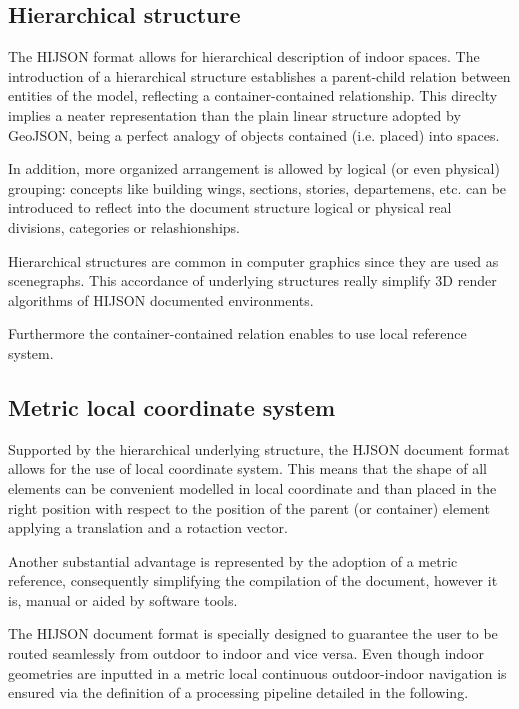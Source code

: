 \documentclass{sig-alternate}
\begin{document}
\subsection{Hierarchical structure}\label{hierarchical-structure}

The HIJSON format allows for hierarchical description of indoor spaces.  The
introduction of a hierarchical structure establishes a parent-child relation
between entities of the model, reflecting a container-contained relationship.
This direclty implies a neater representation than the plain linear structure
adopted  by GeoJSON, being a perfect analogy of objects contained (i.e.
placed) into spaces.

In addition, more organized arrangement is allowed by logical (or even
physical)  grouping: concepts like building wings, sections, stories,
departemens, etc. can be  introduced to reflect into the document structure
logical or physical real divisions,  categories or relashionships.

Hierarchical structures are common in computer graphics since they are used as
scenegraphs. This accordance of underlying structures really simplify 3D
render algorithms of HIJSON documented environments.

Furthermore the container-contained relation enables to use local reference system.

\subsection{Metric local coordinate system}\label{metric-local-coordinate-system}

Supported by the hierarchical underlying structure, the HJSON document format allows 
for the use of local coordinate system. This means that the shape of all elements can 
be convenient modelled in local coordinate and than placed in the right position 
with respect to the position of the parent (or container) element applying a 
translation and a rotaction vector.

Another substantial advantage is represented by the adoption of a metric reference, 
consequently simplifying the compilation of the document, however it is, 
manual or aided by software tools.

The HIJSON document format is specially designed to guarantee the user to be routed seamlessly 
from outdoor to indoor and vice versa. Even though indoor geometries are inputted in a metric 
local continuous outdoor-indoor navigation is ensured via the definition of a processing pipeline
detailed in the following.
\end{document}
